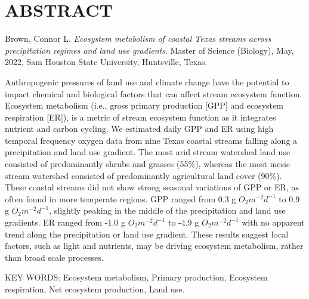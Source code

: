 %

\chapter*{ABSTRACT}

\vspace{-12pt}
\begin{singlespace}
\noindent 
Brown, Connor L. \textit{Ecosystem metabolism of coastal Texas streams across precipitation regimes and land use gradients}. Master of Science (Biology), May, 2022, Sam Houston State University, Huntsville, Texas.
\end{singlespace}

Anthropogenic pressures of land use and climate change have the potential to impact chemical and biological factors that can affect stream ecosystem function. Ecosystem metabolism (i.e., gross primary production [GPP] and ecosystem respiration [ER]), is a metric of stream ecosystem function as it integrates nutrient and carbon cycling. We estimated daily GPP and ER using high temporal frequency oxygen data from nine Texas coastal streams falling along a precipitation and land use gradient. The most arid stream watershed land use consisted of predominantly shrubs and grasses (55\%), whereas the most mesic stream watershed consisted of predominantly agricultural land cover (90\%). These coastal streams did not show strong seasonal variations of GPP or ER, as often found in more temperate regions. GPP ranged from 0.3 g $O_2 m^{-2} d^{-1}$ to 0.9 g $O_2 m^{-2} d^{-1}$, slightly peaking in the middle of the precipitation and land use gradients. ER ranged from -1.0 g $O_2 m^{-2} d^{-1}$ to -4.9 g $O_2 m^{-2} d^{-1}$ with no apparent trend along the precipitation or land use gradient. These results suggest local factors, such as light and nutrients, may be driving ecosystem metabolism, rather than broad scale processes.
\vspace{12pt}
\begin{singlespace} 
\noindent
KEY WORDS: Ecosystem metabolism, Primary production, Ecosystem respiration, Net ecosystem production, Land use.
\end{singlespace}

\endinput
